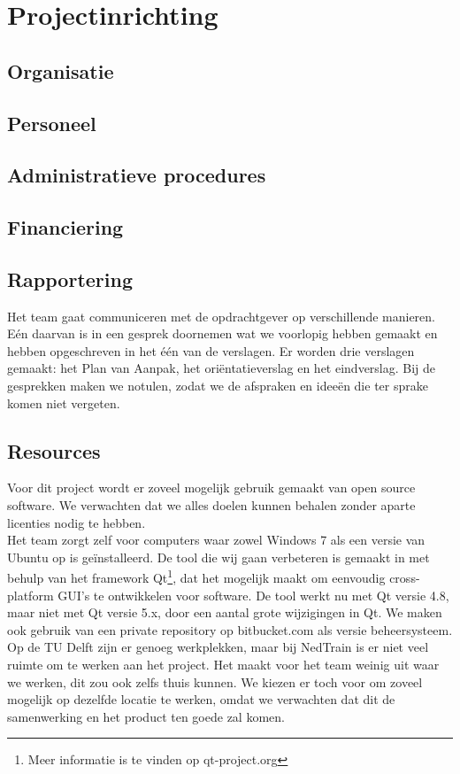 \section{Projectinrichting}
\subsection{Organisatie}
\subsection{Personeel}
\subsection{Administratieve procedures}
\subsection{Financiering}
\subsection{Rapportering}
Het team gaat communiceren met de opdrachtgever op verschillende manieren. E\'en daarvan is in een gesprek doornemen wat we voorlopig hebben gemaakt en hebben opgeschreven in het \'e\'en van de verslagen. Er worden drie verslagen gemaakt: het Plan van Aanpak, het ori\"entatieverslag en het eindverslag. Bij de gesprekken maken we notulen, zodat we de afspraken en idee\"en die ter sprake komen niet vergeten.

\subsection{Resources}
Voor dit project wordt er zoveel mogelijk gebruik gemaakt van open source software. We verwachten dat we alles doelen kunnen behalen zonder aparte licenties nodig te hebben. \\

Het team zorgt zelf voor computers waar zowel Windows 7 als een versie van Ubuntu op is ge\"installeerd. De tool die wij gaan verbeteren is gemaakt in \cpp met behulp van het framework Qt\footnote{Meer informatie is te vinden op qt-project.org}, dat het mogelijk maakt om eenvoudig cross-platform GUI's te ontwikkelen voor \cpp software. De tool werkt nu met Qt versie 4.8, maar niet met Qt versie 5.x, door een aantal grote wijzigingen in Qt. We maken ook gebruik van een private repository op bitbucket.com als versie beheersysteem. \\

Op de TU Delft zijn er genoeg werkplekken, maar bij NedTrain is er niet veel ruimte om te werken aan het project. Het maakt voor het team weinig uit waar we werken, dit zou ook zelfs thuis kunnen. We kiezen er toch voor om zoveel mogelijk op dezelfde locatie te werken, omdat we verwachten dat dit de samenwerking en het product ten goede zal komen. 
